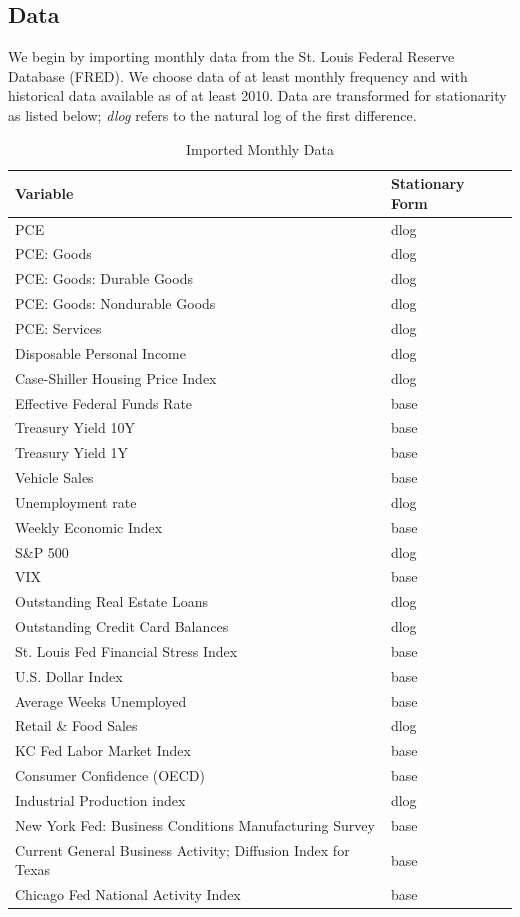 \documentclass[11pt, letterpaper]{article}\usepackage[]{graphicx}\usepackage[]{color}
\begin{document}
\subsection{Data}
We begin by importing monthly data from the St. Louis Federal Reserve Database (FRED). We choose data of at least monthly frequency and with historical data available as of at least 2010. Data are transformed for stationarity as listed below; \textit{dlog} refers to the natural log of the first difference.

\begin{table}[!h]
\centering
\begingroup\scriptsize
\begin{tabular}{ll}
  \hline
Variable & Stationary Form \\ 
  \hline
PCE & dlog \\ 
  PCE: Goods & dlog \\ 
  PCE: Goods: Durable Goods & dlog \\ 
  PCE: Goods: Nondurable Goods & dlog \\ 
  PCE: Services & dlog \\ 
  Disposable Personal Income & dlog \\ 
  Case-Shiller Housing Price Index & dlog \\ 
  Effective Federal Funds Rate & base \\ 
  Treasury Yield 10Y & base \\ 
  Treasury Yield 1Y & base \\ 
  Vehicle Sales & base \\ 
  Unemployment rate & dlog \\ 
  Weekly Economic Index & base \\ 
  S\&P 500 & dlog \\ 
  VIX & base \\ 
  Outstanding Real Estate Loans & dlog \\ 
  Outstanding Credit Card Balances & dlog \\ 
  St. Louis Fed Financial Stress Index & base \\ 
  U.S. Dollar Index & base \\ 
  Average Weeks Unemployed & base \\ 
  Retail \& Food Sales & dlog \\ 
  KC Fed Labor Market Index & base \\ 
  Consumer Confidence (OECD) & base \\ 
  Industrial Production index & dlog \\ 
  New York Fed: Business Conditions Manufacturing Survey & base \\ 
  Current General Business Activity; Diffusion Index for Texas & base \\ 
  Chicago Fed National Activity Index & base \\ 
   \hline
\end{tabular}
\endgroup
\caption{Imported Monthly Data} 
\end{table}
\end{document}
